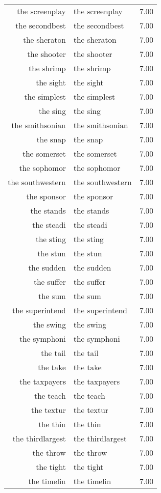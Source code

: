 \begin{table}[ht]
\begin{tabular}{rlr}
  the screenplay & the screenplay & 7.00 \\ 
  the secondbest & the secondbest & 7.00 \\ 
  the sheraton & the sheraton & 7.00 \\ 
  the shooter & the shooter & 7.00 \\ 
  the shrimp & the shrimp & 7.00 \\ 
  the sight & the sight & 7.00 \\ 
  the simplest & the simplest & 7.00 \\ 
  the sing & the sing & 7.00 \\ 
  the smithsonian & the smithsonian & 7.00 \\ 
  the snap & the snap & 7.00 \\ 
  the somerset & the somerset & 7.00 \\ 
  the sophomor & the sophomor & 7.00 \\ 
  the southwestern & the southwestern & 7.00 \\ 
  the sponsor & the sponsor & 7.00 \\ 
  the stands & the stands & 7.00 \\ 
  the steadi & the steadi & 7.00 \\ 
  the sting & the sting & 7.00 \\ 
  the stun & the stun & 7.00 \\ 
  the sudden & the sudden & 7.00 \\ 
  the suffer & the suffer & 7.00 \\ 
  the sum & the sum & 7.00 \\ 
  the superintend & the superintend & 7.00 \\ 
  the swing & the swing & 7.00 \\ 
  the symphoni & the symphoni & 7.00 \\ 
  the tail & the tail & 7.00 \\ 
  the take & the take & 7.00 \\ 
  the taxpayers & the taxpayers & 7.00 \\ 
  the teach & the teach & 7.00 \\ 
  the textur & the textur & 7.00 \\ 
  the thin & the thin & 7.00 \\ 
  the thirdlargest & the thirdlargest & 7.00 \\ 
  the throw & the throw & 7.00 \\ 
  the tight & the tight & 7.00 \\ 
  the timelin & the timelin & 7.00 \\ 

\end{tabular}
\end{table}
